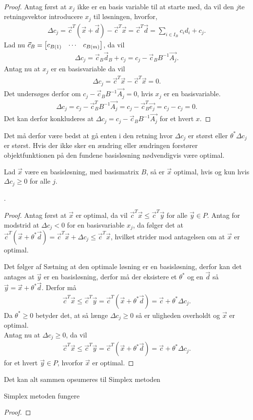 \begin{proof}
Antag først at $x_j$ ikke er en basis variable til at starte med, da vil den $j$te retningsvektor introducere $x_j$ til løsningen, hvorfor,
\begin{align*}
\Delta c_j = \vec{c}^T(\vec{x}+ \vec{d}) - \vec{c}^T\vec{x} = \vec{c}^T\vec{d} = \sum_{i \in I_B} c_i d_i + c_j.
\end{align*}
Lad nu $\vec{c}_B = \begin{bmatrix} c_{B(1)}& \cdots & c_{B(m)} \end{bmatrix}$, da vil
\begin{align}
\Delta c_j =\vec{c}_B\vec{d}_B+ c_j = c_j-\vec{c}_B B^{-1}\vec{A_j}.
\end{align}
Antag nu at $x_j$ er en basisvariable da vil 
\begin{align*}
\Delta c_j = \vec{c}^T\vec{x}- \vec{c}^T\vec{x} = 0.
\end{align*}
Det undersøges derfor om $ c_j-\vec{c}_B B^{-1}\vec{A_j}= 0$, hvis $x_j$ er en basisvariable.
\begin{align*}
 \Delta c_j = c_j-\vec{c}_B^T B^{-1}\vec{A_j} = c_j - \vec{c}_B^T \vec{e_j} = c_j - c_j = 0.
\end{align*}
Det kan derfor konkluderes at $\Delta c_j = c_j-\vec{c}_B B^{-1}\vec{A_j}$ for et hvert $x$.
\end{proof}
Det må derfor være bedst at gå enten i den retning hvor $\Delta c_j$ er størst eller $\theta^*\Delta c_j$ er størst. 
Hvis der ikke sker en ændring eller ændringen forstører objektfunktionen på den fundene basisløsning nødvendigvis være optimal.
\begin{stn}
Lad $\vec{x}$ være en basisløsning, med basismatrix $B$, så er $\vec{x}$ optimal, hvis og kun hvis $\Delta c_j \geq 0$ for alle $j$.
\end{stn}.
\begin{proof}
Antag først at $\vec{x}$ er optimal, da vil $\vec{c}^T\vec{x} \leq \vec{c}^T\vec{y}$ for alle $\vec{y} \in P$. 
Antag for modstrid at $\Delta c_j < 0$ for en basisvariable $x_j$, da følger det at $\vec{c}^T(\vec{x}+\theta^*\vec{d}) = \vec{c}^T\vec{x} + \Delta c_j \leq \vec{c}^T\vec{x}$, hvilket strider mod antagelsen om at $\vec{x}$ er optimal.


Det følger af Sætning
at den optimale løsning er en basisløsning, derfor kan det antages at $\vec{y}$ er en basisløsning, derfor må der eksistere et $\theta^*$ og en $\vec{d}$ så $\vec{y} = \vec{x}+ \theta^* \vec{d}$.
Derfor må
\begin{align*}
	\vec{c}^T\vec{x}\leq \vec{c}^T\vec{y} = \vec{c}^T(\vec{x}+\theta^*\vec{d}) = \vec{c} + \theta^* \Delta c_j.
\end{align*}
Da $\theta^* \geq 0$ betyder det, at så længe $\Delta c_j \geq 0$ så er uligheden overholdt og $\vec{x}$ er optimal.
\\ Antag nu at $\Delta c_j \geq 0$, da vil  
\begin{align*}
	\vec{c}^T\vec{x}\leq \vec{c}^T\vec{y} = \vec{c}^T(\vec{x}+\theta^*\vec{d}) = \vec{c} + \theta^* \Delta c_j.
\end{align*}
for et hvert $\vec{y} \in P$, hvorfor $\vec{x}$ er optimal.

\end{proof}
Det kan alt sammen opsumeres til Simplex metoden


\begin{stn}
Simplex metoden fungere
\end{stn}
\begin{proof}

\end{proof}




